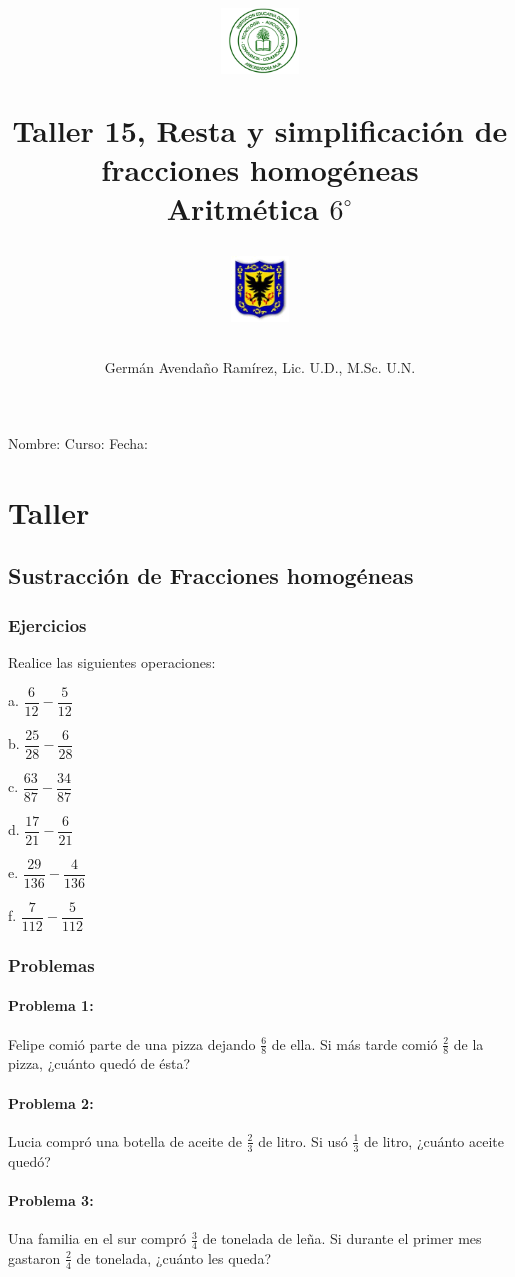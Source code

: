 \documentclass[10pt,twoside]{article}
\author{Germ\'an Avenda\~no Ram\'irez, Lic. U.D., M.Sc. U.N.}
\title{\begin{minipage}{.2\textwidth}
\includegraphics[height=1.75cm]{Images/logo-colegio.png}\end{minipage}
\begin{minipage}{.55\textwidth}
\begin{center}
Taller 15, Resta y simplificación de fracciones homogéneas \\
Aritmética $6^{\circ}$
\end{center}
\end{minipage}\hfill
\begin{minipage}{.2\textwidth}
\includegraphics[height=1.75cm]{Images/logo-sed.png} 
\end{minipage}}
\date{}
\begin{document}
\maketitle
Nombre: \hrulefill Curso: \underline{\hspace*{44pt}} Fecha: \underline{\hspace*{2.5cm}}
\section*{Taller}
\subsection*{Sustracción de Fracciones homog\'{e}neas}
\subsubsection*{Ejercicios}
Realice las siguientes operaciones:
\begin{enumerate}
\begin{multicols}{3}
\item[a.] $\dfrac{6}{12}-\dfrac{5}{12}$
\item[b.] $\dfrac{25}{28}-\dfrac{6}{28}$
\item[c.] $\dfrac{63}{87}-\dfrac{34}{87}$
\item[d.] $\dfrac{17}{21}-\dfrac{6}{21}$
\item[e.] $\dfrac{29}{136}-\dfrac{4}{136}$
\item[f.] $\dfrac{7}{112}-\dfrac{5}{112}$
\end{multicols}
\end{enumerate}
\subsubsection*{Problemas}
\paragraph*{Problema 1:} Felipe comi\'{o} parte de una pizza dejando $\frac{6}{8}$ de ella. Si m\'{a}s tarde comi\'{o} $\frac{2}{8}$ de la pizza, ¿cu\'{a}nto qued\'{o} de \'{e}sta?
\paragraph*{Problema 2:}
Lucia compró una botella de aceite de $\frac{2}{3}$ de litro. Si usó $\frac{1}{3}$ de litro, ¿cuánto aceite quedó?
\paragraph*{Problema 3:} Una familia en el sur compr\'{o} $\frac{3}{4}$ de tonelada de leña. Si durante el primer mes gastaron $\frac{2}{4}$ de tonelada, ¿cuánto les queda?
\end{document}
